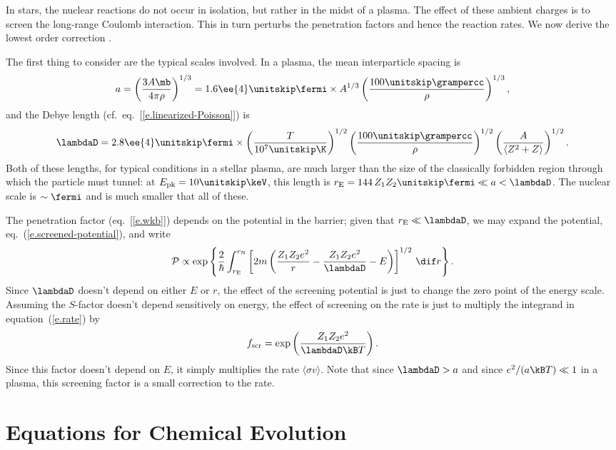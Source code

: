 In stars, the nuclear reactions do not occur in isolation, but rather in the midst of a plasma.  The effect of these ambient charges is to screen the long-range Coulomb interaction. This in turn perturbs the penetration factors and hence the reaction rates. We now derive the lowest order correction \cite{Salpeter1954Electrons-Scree}. 

The first thing to consider are the typical scales involved.  In a plasma, the mean interparticle spacing is 
\[ a = \left(\frac{3A\mb}{4\pi \rho}\right)^{1/3} = 1.6\ee{4}\nsp\fermi\times A^{1/3}\left(\frac{100\nsp\grampercc}{\rho}\right)^{1/3},
\]
and the Debye length (cf.\ eq.~[\ref{e.linearized-Poisson}]) is 
\[
\lambdaD = 2.8\ee{4}\nsp\fermi\times \left(\frac{T}{10^{7}\nsp\K}\right)^{1/2} \left(\frac{100\nsp\grampercc}{\rho}\right)^{1/2} \left(\frac{A}{\langle Z^{2}+Z\rangle}\right)^{1/2}.
\]
Both of these lengths, for typical conditions in a stellar plasma, are much larger than the size of the classically forbidden region through which the particle must tunnel: at $\Epk = 10\nsp\keV$, this length is $\re = 144\,Z_{1}Z_{2}\nsp\fermi \ll a < \lambdaD$.  The nuclear scale is $\sim\fermi$ and is much smaller that all of these.

The penetration factor (eq.~[\ref{e.wkb}]) depends on the potential in the barrier; given that $\re \ll \lambdaD$, we may expand the potential, eq.~(\ref{e.screened-potential}), and write
\begin{equation}
\mathcal{P} \propto \exp\left\{\frac{2}{\hbar}\int_{\re}^{\rn}\left[2m\left(\frac{Z_{1}Z_{2}e^{2}}{r} - \frac{Z_{1}Z_{2}e^{2}}{\lambdaD} - E\right) \right]^{1/2}\,\dif r\right\}.
\end{equation}
Since $\lambdaD$ doesn't depend on either $E$ or $r$, the effect of the screening potential is just to  change the zero point of the energy scale.  Assuming the $S$-factor doesn't depend sensitively on energy, the effect of screening on the rate is just to multiply the integrand in equation~(\ref{e.rate}) by
\begin{equation}\label{e.fscreening}
  f_{\mathrm{scr}} = \exp\left(\frac{Z_{1}Z_{2}e^{2}}{\lambdaD\kB T}\right).
\end{equation}
Since this factor doesn't depend on $E$, it simply multiplies the rate $\langle\sigma v\rangle$.  Note that since $\lambdaD > a$ and since $e^{2}/(a\kB T) \ll 1$ in a plasma, this screening factor is a small correction to the rate.

\section{Equations for Chemical Evolution}\label{e.eqns-for-chem-evol}

